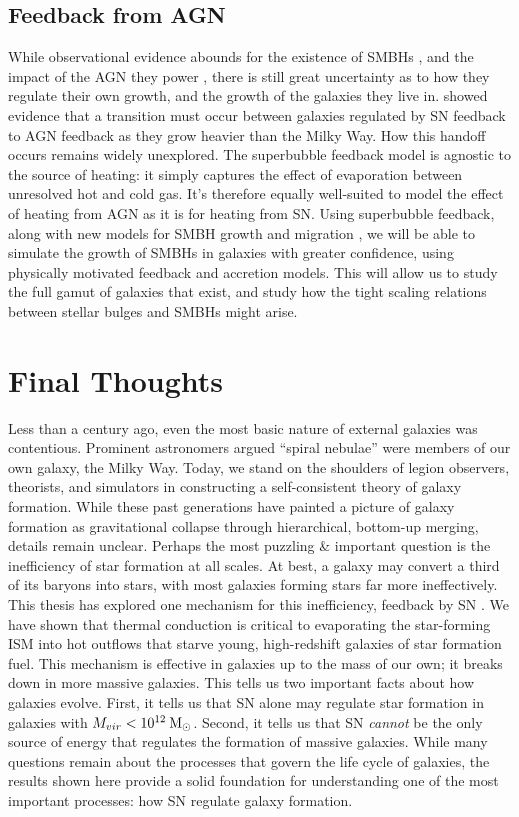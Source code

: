 \subsection{Feedback from AGN}
While observational evidence abounds for the existence of SMBHs
\citep{Kormendy2013}, and the impact of the AGN they power
\citep{Veilleux2005}, there is still great uncertainty as to how they regulate
their own growth, and the growth of the galaxies they live in.
\citet{Keller2016a} showed evidence that a transition must occur between
galaxies regulated by SN feedback to AGN feedback as they grow heavier than the
Milky Way.  How this handoff occurs remains widely unexplored.  The superbubble
feedback model is agnostic to the source of heating: it simply captures the
effect of evaporation between unresolved hot and cold gas.  It's therefore
equally well-suited to model the effect of heating from AGN as it is for heating
from SN.  Using superbubble feedback, along with new models for SMBH growth
\citep{Hopkins2010} and migration \citep{Tremmel2015}, we will be able to
simulate the growth of SMBHs in galaxies with greater confidence, using
physically motivated feedback and accretion models.  This will allow us to study
the full gamut of galaxies that exist, and study how the tight scaling relations
between stellar bulges and SMBHs might arise.

\section{Final Thoughts}
Less than a century ago, even the most basic nature of external galaxies was
contentious.  Prominent astronomers argued ``spiral nebulae'' were members of
our own galaxy, the Milky Way.  Today, we stand on the shoulders of legion
observers, theorists, and simulators in constructing a self-consistent theory of
galaxy formation.  While these past generations have painted a picture of galaxy
formation as gravitational collapse through hierarchical, bottom-up merging,
details remain unclear.  Perhaps the most puzzling \& important question is the
inefficiency of star formation at all scales.  At best, a galaxy may convert a
third of its baryons into stars, with most galaxies forming stars far more
ineffectively.  This thesis has explored one mechanism for this inefficiency,
feedback by SN .  We have shown that thermal conduction is critical to
evaporating the star-forming ISM into hot outflows that starve young,
high-redshift galaxies of star formation fuel.  This mechanism is effective in
galaxies up to the mass of our own; it breaks down in more massive galaxies.
This tells us two important facts about how galaxies evolve.  First, it tells us
that SN alone may regulate star formation in galaxies with $M_{vir} <
10^{12}\>{\rm M_{\odot}}$.  Second, it tells us that SN {\it cannot} be the only source of
energy that regulates the formation of massive galaxies.  While many questions
remain about the processes that govern the life cycle of galaxies, the results
shown here provide a solid foundation for understanding one of the most
important processes: how SN regulate galaxy formation.



